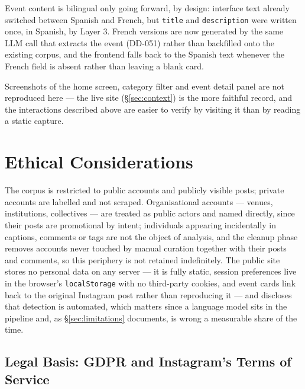 \documentclass[12pt, a4paper]{report}
\begin{document}
Event content is bilingual only going forward, by design: interface text
already switched between Spanish and French, but \texttt{title} and
\texttt{description} were written once, in Spanish, by Layer 3. French
versions are now generated by the same LLM call that extracts the event
(DD-051) rather than backfilled onto the existing corpus, and the
frontend falls back to the Spanish text whenever the French field is
absent rather than leaving a blank card.

Screenshots of the home screen, category filter and event detail panel
are not reproduced here — the live site
(\S\ref{sec:context}) is the more faithful record, and the interactions
described above are easier to verify by visiting it than by reading a
static capture.

\section{Ethical Considerations}
\label{sec:ethics}

The corpus is restricted to public accounts and publicly visible posts;
private accounts are labelled and not scraped. Organisational accounts —
venues, institutions, collectives — are treated as public actors and
named directly, since their posts are promotional by intent; individuals
appearing incidentally in captions, comments or tags are not the object
of analysis, and the cleanup phase removes accounts never touched by
manual curation together with their posts and comments, so this
periphery is not retained indefinitely. The public site stores no
personal data on any server — it is fully static, session preferences
live in the browser's \texttt{localStorage} with no third-party cookies,
and event cards link back to the original Instagram post rather than
reproducing it — and discloses that detection is automated, which
matters since a language model sits in the pipeline and, as
\S\ref{sec:limitations} documents, is wrong a measurable share of the
time.

\subsection{Legal Basis: GDPR and Instagram's Terms of Service}
\label{sec:gdpr}
\end{document}
